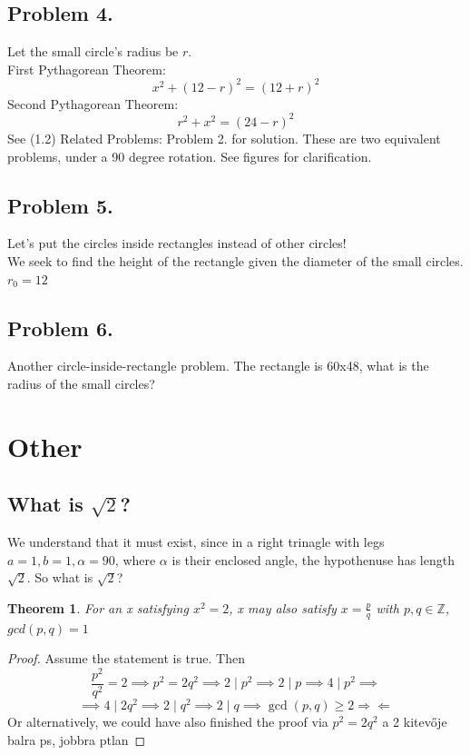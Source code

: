 \documentclass{article}
\newtheorem{theorem}{Theorem}
\begin{document}
\subsection{Problem 4.}
Let the small circle's radius be $r$.\\
First Pythagorean Theorem:
\begin{equation}
    x^2 + (12 - r)^2 = (12 + r)^2
\end{equation}
Second Pythagorean Theorem:
\begin{equation}
    r^2 + x^2 = (24-r)^2
\end{equation}
See (1.2) Related Problems: Problem 2. for solution. These are two equivalent problems, under a 90 degree rotation. See figures for clarification.

\subsection{Problem 5.}
Let's put the circles inside rectangles instead of other circles!\\
We seek to find the height of the rectangle given the diameter of the small circles.\\
$r_0 = 12$

\subsection{Problem 6.}
Another circle-inside-rectangle problem. The rectangle is 60x48, what is the radius of the small circles?

\section{Other}
\subsection{What is $\sqrt{2}$?}
We understand that it must exist, since in a right trinagle with legs $a = 1, b= 1, \alpha = 90$, where $\alpha$ is their enclosed angle, the hypothenuse has length $\sqrt{2}$. So what is $\sqrt{2}$?
\\
\begin{theorem}
    For an x satisfying $x^2 = 2$, x may also satisfy $x = \frac{p}{q}$ with $p, q \in \mathbb{Z}$, $gcd(p, q) = 1$
\end{theorem}
\begin{proof}
    Assume the statement is true. Then
    \begin{equation}
        \frac{p^2}{q^2} = 2 \implies p^2 = 2q^2 \implies 2 \mid p^2 \implies 2 \mid p \implies 4 \mid p^2 \implies
    \end{equation}
    \begin{equation}
        \implies 4 \mid 2q^2 \implies 2 \mid q^2 \implies 2 \mid q \implies \gcd(p, q) \ge 2 \Rightarrow\!\Leftarrow
    \end{equation}
    Or alternatively, we could have also finished the proof via
    $p^2 = 2q^2$ a 2 kitevője balra ps, jobbra ptlan
\end{proof}
\end{document}
